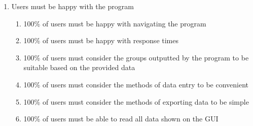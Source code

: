 \documentclass{article}
\begin{document}
\begin{enumerate}
\begin{enumerate}
\begin{enumerate}
            \item The header colour must be of hex code \#FFDB32
            \item The header may contain buttons, solely for navigation, on the right
        \end{enumerate}
        \item Data about different entities must be visually separate by keeping all the data about each single entity within individual boxes
        \item Buttons that perform a function that cannot be performed at that time must be greyed out, and feature text below stating how to enable the button
        \item Buttons that lead to a different page must feature the name of the page, or the relationship between the current page and next (e.g. "back")
        \item Up to 6 colours can be used to visually separate entities through colour. Red, orange, yellow, green, blue, purple. These colours must have RGB values all greater than 186 to ensure the text remains legible
    \end{enumerate}
    \item Users must be happy with the program
    \begin{enumerate}
        \item 100\% of users must be happy with navigating the program
        \item 100\% of users must be happy with response times
        \item 100\% of users must consider the groups outputted by the program to be suitable based on the provided data
        \item 100\% of users must consider the methods of data entry to be convenient
        \item 100\% of users must consider the methods of exporting data to be simple
        \item 100\% of users must be able to read all data shown on the GUI
    \end{enumerate}
\end{enumerate}

\clearpage
\end{document}
